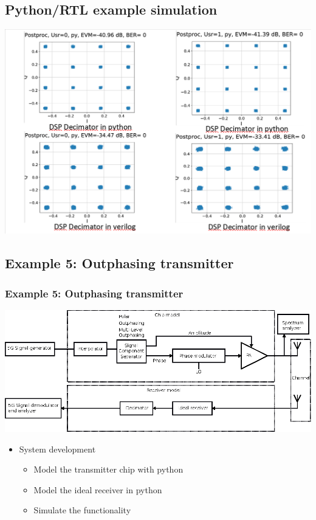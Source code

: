 \documentclass[logo=bluequo,normaltitle]{aaltoslides}
\begin{document}
\renewcommand{\sectionname}{Python/RTL example simulation}
\subsection*{\sectionname}
\begin{frame}[c]
    \includegraphics[width=\textwidth]{Pics/DSP-example-fader2-decimator_effect.png}
\end{frame}

\renewcommand{\sectionname}{Example 5: Outphasing transmitter}
\subsection*{\sectionname}
\begin{frame}[c]
    \frametitle{\sectionname}
    \centering\includegraphics[width=\textwidth]{Pics/HT_system.eps}
    \begin{itemize}
        \item System development
            \begin{itemize}
                \item  Model the transmitter chip with python
                \item  Model the ideal receiver in python
                \item  Simulate the functionality
            \end{itemize}
    \end{itemize}
\end{frame}
\end{document}
